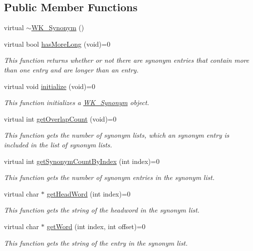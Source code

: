 \subsection*{Public Member Functions}
\begin{CompactItemize}
\item 
virtual \hyperlink{classWK__Synonym_ce4316ab85a3a9e85bfa3ad3f01b3d2e}{$\sim$WK\_\-Synonym} ()
\item 
virtual bool \hyperlink{classWK__Synonym_71c1c134392af940e8e2a1e003c511cf}{hasMoreLong} (void)=0
\begin{CompactList}\small\item\em This function returns whether or not there are synonym entries that contain more than one entry and are longer than an entry. \item\end{CompactList}\item 
virtual void \hyperlink{classWK__Synonym_f76814cfdd7eb55208f0370481aaa398}{initialize} (void)=0
\begin{CompactList}\small\item\em This function initializes a \hyperlink{classWK__Synonym}{WK\_\-Synonym} object. \item\end{CompactList}\item 
virtual int \hyperlink{classWK__Synonym_a2ba8f7959f61d8b551e6982bcebc459}{getOverlapCount} (void)=0
\begin{CompactList}\small\item\em This function gets the number of synonym lists, which an synonym entry is included in the list of synonym lists. \item\end{CompactList}\item 
virtual int \hyperlink{classWK__Synonym_3a50ddb83a62f2bf3fa3d4317ea42742}{getSynonymCountByIndex} (int index)=0
\begin{CompactList}\small\item\em This function gets the number of synonym entries in the synonym list. \item\end{CompactList}\item 
virtual char $\ast$ \hyperlink{classWK__Synonym_50cacdd04cddb986eed20886aad03351}{getHeadWord} (int index)=0
\begin{CompactList}\small\item\em This function gets the string of the headword in the synonym list. \item\end{CompactList}\item 
virtual char $\ast$ \hyperlink{classWK__Synonym_f4d75e1d6a074196c04d8857802d9414}{getWord} (int index, int offset)=0
\begin{CompactList}\small\item\em This function gets the string of the entry in the synonym list. \item\end{CompactList}\end{CompactItemize}
